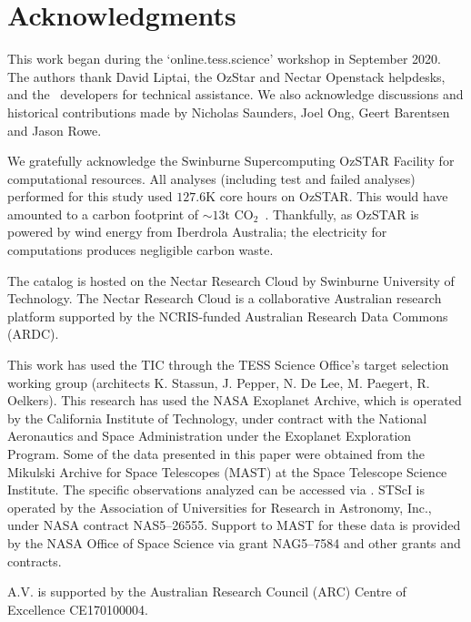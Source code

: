 \documentclass[floatfix,ApJL,twocolumn]{aastex631}
\begin{document}



\section*{Acknowledgments}{

This work began during the `online.tess.science' workshop in September 2020.
The authors thank David Liptai, the OzStar and Nectar Openstack helpdesks, and the \lightkurve\ developers for technical assistance. We also acknowledge discussions and historical contributions made by Nicholas Saunders, Joel Ong, Geert Barentsen and Jason Rowe.

We gratefully acknowledge the Swinburne Supercomputing OzSTAR Facility for computational resources. All analyses (including test and failed analyses) performed for this study used $127.6$K core hours on OzSTAR. This would have amounted to a carbon footprint of ${\sim13{\text{t CO}_2}}$~\citep{greenhouse, energy_to_co2_converter}. Thankfully, as OzSTAR is powered by wind energy from Iberdrola Australia; the electricity for computations produces negligible carbon waste.

The catalog is hosted on the Nectar Research Cloud by Swinburne University of Technology. The Nectar Research Cloud is a collaborative Australian research platform supported by the NCRIS-funded Australian Research Data Commons (ARDC).

This work has used the TIC through the TESS Science Office’s target selection working group (architects K. Stassun, J. Pepper, N. De Lee, M. Paegert, R. Oelkers). This research has used the NASA Exoplanet Archive, which is operated by the California Institute of Technology, under contract with the National Aeronautics and Space Administration under the Exoplanet Exploration Program. Some of the data presented in this paper were obtained from the Mikulski Archive for Space Telescopes (MAST) at the Space Telescope Science Institute. The specific observations analyzed can be accessed via \mastDatabase. STScI is operated by the Association of Universities for Research in Astronomy, Inc., under NASA contract NAS5–26555. Support to MAST for these data is provided by the NASA Office of Space Science via grant NAG5–7584 and other grants and contracts.

A.V. is supported by the Australian Research Council (ARC) Centre of Excellence CE170100004.
}
\end{document}
